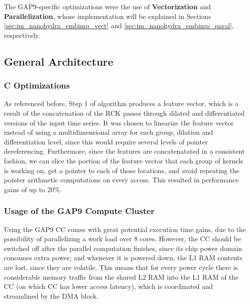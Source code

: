        The GAP9-specific optimizations were the use of \textbf{Vectorization} and \textbf{Parallelization}, whose implementation will be explained in Sections \ref{sec:im_nanohydra_embimp_vect} and \ref{sec:im_nanohydra_embimp_paral}, respectively.

        \subsection{General Architecture}\label{sec:im_nanohydra_embimp_genopt}

        \subsubsection{C Optimizations}
        As referenced before, Step 1 of algorithm produces a feature vector, which is a result of the concatenation of the RCK passes through dilated and differentiated versions of the input time series. It was chosen to linearize
        the feature vector instead of using a multidimensional array for each group, dilation and differentiation level, since this would require several levels of pointer dereferencing. Furthermore, since the features are concatenatated in 
        a consistent fashion, we can slice the portion of the feature vector that each group of kernels is working on, get a pointer to each of those locations, and avoid repeating the pointer arithmetic computations on every access. This resulted
        in performance gains of up to 20\%.

        \subsubsection{Usage of the GAP9 Compute Cluster}\label{sec:im_nanohydra_usage_cc}
        Using the GAP9 CC comes with great potential execution time gains, due to the possibility of parallelizing a work load over 8 cores. However, the CC should be switched off after the parallel computation finishes, since
        its chip power domain consumes extra power; and whenever it is powered down, the L1 RAM contents are lost, since they are volatile. This means that for every power cycle there is considerable memory traffic from the shared L2 RAM into
        the L1 RAM of the CC (on which CC has lower access latency), which is coordinated and streamlined by the DMA block.

